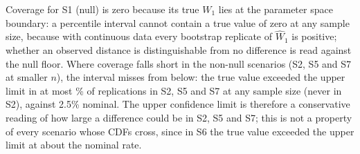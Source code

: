 \documentclass[AMA,Times1COL]{WileyNJDv5}
\begin{document}
Coverage for S1 (null) is zero because its true $W_1$ lies at the parameter space boundary: a percentile interval cannot contain a true value of zero at any sample size, because with continuous data every bootstrap replicate of $\widehat{W}_1$ is positive; whether an observed distance is distinguishable from no difference is read against the null floor. Where coverage falls short in the non-null scenarios (S2, S5 and S7 at smaller $n$), the interval misses from below: the true value exceeded the upper limit in at most \% of replications in S2, S5 and S7 at any sample size (never in S2), against 2.5\% nominal. The upper confidence limit is therefore a conservative reading of how large a difference could be in S2, S5 and S7; this is not a property of every scenario whose CDFs cross, since in S6 the true value exceeded the upper limit at about the nominal rate.
\end{document}
